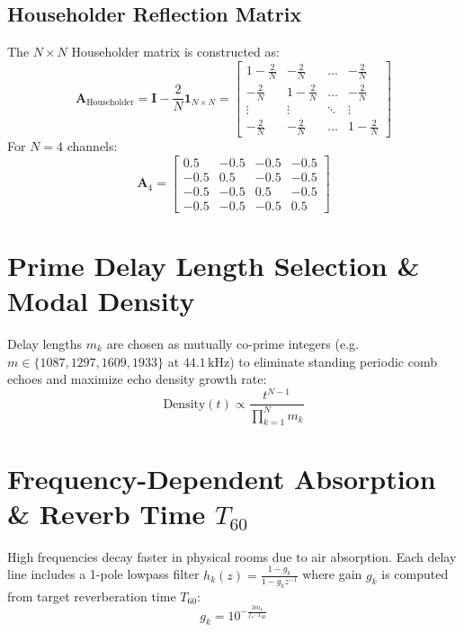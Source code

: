 \documentclass[11pt,a4paper]{article}
\begin{document}
\subsection{Householder Reflection Matrix}
The $N \times N$ Householder matrix is constructed as:
\begin{equation}
\mathbf{A}_{\text{Householder}} = \mathbf{I} - \frac{2}{N} \mathbf{1}_{N \times N} =
\begin{bmatrix}
1 - \frac{2}{N} & -\frac{2}{N} & \dots & -\frac{2}{N} \\
-\frac{2}{N} & 1 - \frac{2}{N} & \dots & -\frac{2}{N} \\
\vdots & \vdots & \ddots & \vdots \\
-\frac{2}{N} & -\frac{2}{N} & \dots & 1 - \frac{2}{N}
\end{bmatrix}
\end{equation}
For $N = 4$ channels:
\begin{equation}
\mathbf{A}_4 = \begin{bmatrix}
0.5 & -0.5 & -0.5 & -0.5 \\
-0.5 & 0.5 & -0.5 & -0.5 \\
-0.5 & -0.5 & 0.5 & -0.5 \\
-0.5 & -0.5 & -0.5 & 0.5
\end{bmatrix}
\end{equation}

\section{Prime Delay Length Selection \& Modal Density}
Delay lengths $m_k$ are chosen as mutually co-prime integers (e.g. $m \in \{1087, 1297, 1609, 1933\}$ at $44.1\,\text{kHz}$) to eliminate standing periodic comb echoes and maximize echo density growth rate:
\begin{equation}
\text{Density}(t) \propto \frac{t^{N-1}}{\prod_{k=1}^N m_k}
\end{equation}

\section{Frequency-Dependent Absorption \& Reverb Time $T_{60}$}
High frequencies decay faster in physical rooms due to air absorption. Each delay line includes a 1-pole lowpass filter $h_k(z) = \frac{1 - g_k}{1 - g_k z^{-1}}$ where gain $g_k$ is computed from target reverberation time $T_{60}$:
\begin{equation}
g_k = 10^{-\frac{3 m_k}{f_s \cdot T_{60}}}
\end{equation}
\end{document}
